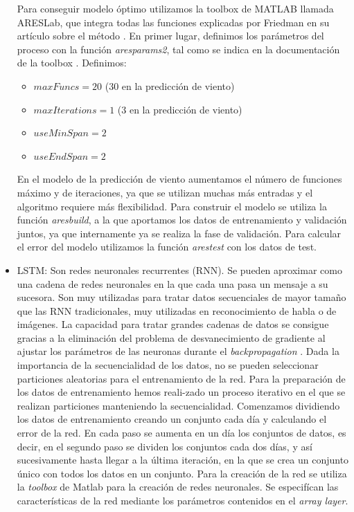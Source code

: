 \documentclass[journal]{IEEEtran}
\begin{document}
\begin{itemize}
    Para conseguir modelo óptimo utilizamos la toolbox de MATLAB llamada ARESLab, que integra todas las funciones explicadas por Friedman en su artículo sobre el método \cite{JHFRIEDMAN1991}. En primer lugar, definimos los parámetros del proceso con la función \emph{aresparams2}, tal como se indica en la documentación de la toolbox \cite{ARESLAB2016}. Definimos:
    \begin{itemize}
        \item $maxFuncs = 20$ ($30$ en la predicción de viento)
        \item $maxIterations = 1$ ($3$ en la predicción de viento)
        \item $useMinSpan = 2$
        \item $useEndSpan = 2$
    \end{itemize}
    En el modelo de la predicción de viento aumentamos el número de funciones máximo y de iteraciones, ya que se utilizan muchas más entradas y el algoritmo requiere más flexibilidad.
    Para construir el modelo se utiliza la función \emph{aresbuild}, a la que aportamos los datos de entrenamiento y validación juntos, ya que internamente ya se realiza la fase de validación.
    Para calcular el error del modelo utilizamos la función \emph{arestest} con los datos de test.
    \item LSTM: Son redes neuronales recurrentes (RNN). Se pueden aproximar como una cadena de redes neuronales en la que cada una pasa un mensaje a su sucesora. Son muy utilizadas para tratar datos secuenciales de mayor tamaño que las RNN tradicionales, muy utilizadas en reconocimiento de habla o de imágenes. La capacidad para tratar grandes cadenas de datos se consigue gracias a la eliminación del problema de desvanecimiento de gradiente al ajustar los parámetros de las neuronas durante el \emph{backpropagation} \cite{45500}.
     Dada la importancia de la secuencialidad de los datos, no se pueden seleccionar particiones aleatorias para el entrenamiento de la red.  Para la preparación de los datos de entrenamiento hemos reali-zado un proceso iterativo en el que se realizan particiones manteniendo la secuencialidad. Comenzamos dividiendo los datos de entrenamiento creando un conjunto cada día y calculando el error de la red. En cada paso se aumenta en un día los conjuntos de datos, es decir, en el segundo paso se dividen los conjuntos cada dos días, y así sucesivamente hasta llegar a la última iteración, en la que se crea un conjunto único con todos los datos en un conjunto.
    Para la creación de la red se utiliza la \emph{toolbox} de Matlab para la creación de redes neuronales. Se especifícan las características de la red mediante los parámetros contenidos en el \emph{array layer}.

\end{itemize}
\end{document}
